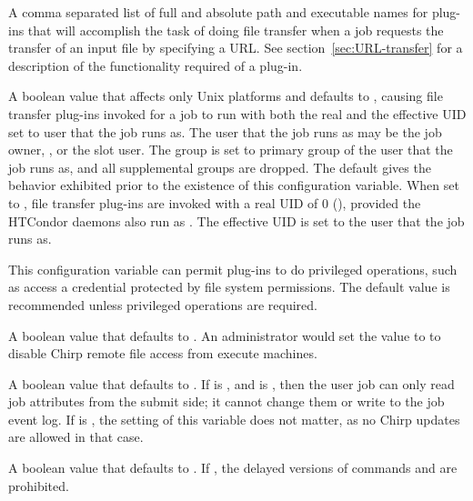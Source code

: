 \begin{description}
\label{param:FiletransferPlugins} 
\item[\Macro{FILETRANSFER\_PLUGINS}]
  A comma separated list of full and absolute path and executable names
  for plug-ins that will accomplish the task of doing file transfer
  when a job requests the transfer of an input file by specifying a URL. 
  See section~\ref{sec:URL-transfer} for a description of the functionality
  required of a plug-in.

\label{param:RunFiletransferPluginsWithRoot} 
\item[\Macro{RUN\_FILETRANSFER\_PLUGINS\_WITH\_ROOT}]
  A boolean value that affects only Unix platforms and defaults to ,
  causing file transfer plug-ins invoked for a job to run with both
  the real and the effective UID set to user that the job runs as.
  The user that the job runs as may be the job owner, ,
  or the slot user.
  The group is set to primary group of the user that the job runs as, 
  and all supplemental groups are dropped.
  The default gives the behavior exhibited prior to the existence of
  this configuration variable.
  When set to ,
  file transfer plug-ins are invoked with a real UID of 0 (),
  provided the HTCondor daemons also run as .
  The effective UID is set to the user that the job runs as.

  This configuration variable can permit plug-ins to do privileged operations,
  such as access a credential protected by file system permissions.
  The default value is recommended unless privileged operations are 
  required.

\label{param:EnableChirp} 
\item[\Macro{ENABLE\_CHIRP}]
  A boolean value that defaults to . An administrator
  would set the value to  to disable Chirp remote file access 
  from execute machines. 

\label{param:EnableChirpUpdates}
\item[\Macro{ENABLE\_CHIRP\_UPDATES}]
  A boolean value that defaults to .  If 
  is , and  is ,
  then the user job can only read job attributes from the submit side;
  it cannot change them or write to the job event log.
  If  is ,
  the setting of this variable does not matter, 
  as no Chirp updates are allowed in that case.

\label{param:EnableChirpDelayed}
\item[\Macro{ENABLE\_CHIRP\_DELAYED}]
  A boolean value that defaults to . 
  If , the delayed versions of  commands
   and  are prohibited.


\end{description}

